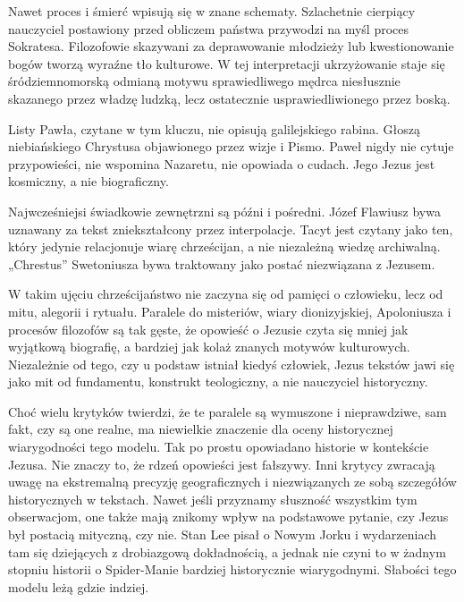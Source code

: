 Nawet proces i śmierć wpisują się w znane schematy.
Szlachetnie cierpiący nauczyciel postawiony przed obliczem państwa przywodzi na myśl proces Sokratesa.
Filozofowie skazywani za deprawowanie młodzieży lub kwestionowanie bogów tworzą wyraźne tło kulturowe.
W tej interpretacji ukrzyżowanie staje się śródziemnomorską odmianą motywu sprawiedliwego mędrca niesłusznie skazanego przez władzę ludzką, lecz ostatecznie usprawiedliwionego przez boską.

Listy Pawła, czytane w tym kluczu, nie opisują galilejskiego rabina.
Głoszą niebiańskiego Chrystusa objawionego przez wizje i Pismo.
Paweł nigdy nie cytuje przypowieści, nie wspomina Nazaretu, nie opowiada o cudach.
Jego Jezus jest kosmiczny, a nie biograficzny.

Najwcześniejsi świadkowie zewnętrzni są późni i pośredni.
Józef Flawiusz bywa uznawany za tekst zniekształcony przez interpolacje.
Tacyt jest czytany jako ten, który jedynie relacjonuje wiarę chrześcijan, a nie niezależną wiedzę archiwalną.
„Chrestus” Swetoniusza bywa traktowany jako postać niezwiązana z Jezusem.

W takim ujęciu chrześcijaństwo nie zaczyna się od pamięci o człowieku, lecz od mitu, alegorii i rytuału.
Paralele do misteriów, wiary dionizyjskiej, Apoloniusza i procesów filozofów są tak gęste, że opowieść o Jezusie czyta się mniej jak wyjątkową biografię, a bardziej jak kolaż znanych motywów kulturowych.
Niezależnie od tego, czy u podstaw istniał kiedyś człowiek, Jezus tekstów jawi się jako mit od fundamentu, konstrukt teologiczny, a nie nauczyciel historyczny.

Choć wielu krytyków twierdzi, że te paralele są wymuszone i nieprawdziwe, sam fakt, czy są one realne, ma niewielkie znaczenie dla oceny historycznej wiarygodności tego modelu.
Tak po prostu opowiadano historie w kontekście Jezusa.
Nie znaczy to, że rdzeń opowieści jest fałszywy.
Inni krytycy zwracają uwagę na ekstremalną precyzję geograficznych i niezwiązanych ze sobą szczegółów historycznych w tekstach.
Nawet jeśli przyznamy słuszność wszystkim tym obserwacjom, one także mają znikomy wpływ na podstawowe pytanie, czy Jezus był postacią mityczną, czy nie.
Stan Lee pisał o Nowym Jorku i wydarzeniach tam się dziejących z drobiazgową dokładnością, a jednak nie czyni to w żadnym stopniu historii o Spider-Manie bardziej historycznie wiarygodnymi.
Słabości tego modelu leżą gdzie indziej.

